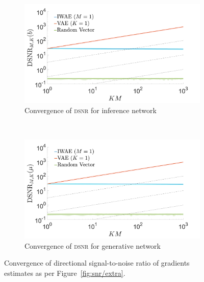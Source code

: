 \begin{figure}[h]
	\centering
	\begin{subfigure}[b]{0.45\textwidth}
		\centering
		\includegraphics[width=\textwidth]{figures/tighter_bounds/hv_snr_dir}
		\caption{Convergence of \textsc{dsnr} for inference network\label{fig:hv/snr_dir}}
	\end{subfigure}~~~~~~~~~~
	\begin{subfigure}[b]{0.45\textwidth}
		\centering
		\includegraphics[width=\textwidth]{figures/tighter_bounds/hv_snr_dir_mu}
		\caption{Convergence of \textsc{dsnr} for generative network\label{fig:hv/snr_dir_mu}}
	\end{subfigure}
	\caption{Convergence of directional signal-to-noise ratio of gradients estimates 
		as per Figure~\ref{fig:snr/extra}.
		\label{fig:hv/extra_end}}
\end{figure}

